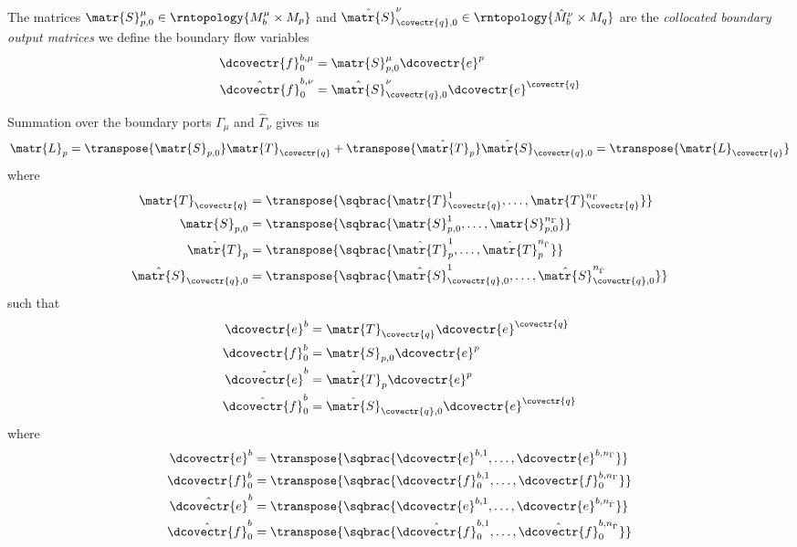 The matrices $\matr{S}^{\mu}_{p,0}\in\rntopology{M^{\mu}_{b}\times M_{p}}$ and
$\hat{\matr{S}}^{\nu}_{\covectr{q},0}\in\rntopology{\hat{M}^{\nu}_{b}\times
  M_{q}}$ are the \emph{collocated boundary output matrices} we define the
boundary flow variables \ie
\begin{align}
  \dcovectr{f}^{b,\mu}_{0}&=\matr{S}^{\mu}_{p,0}\dcovectr{e}^{p}\\
  \hat{\dcovectr{f}}^{b,\nu}_{0}&=\hat{\matr{S}}^{\nu}_{\covectr{q},0}\dcovectr{e}^{\covectr{q}}
\end{align}

Summation over the boundary ports $\Gamma_{\mu}$ and $\hat{\Gamma}_{\nu}$
gives us
\begin{equation}
  \matr{L}_{p}=\transpose{\matr{S}_{p,0}}\matr{T}_{\covectr{q}}+\transpose{\hat{\matr{T}}_{p}}\hat{\matr{S}}_{\covectr{q},0}=\transpose{\matr{L}_{\covectr{q}}}
\end{equation}
where
\begin{align}
  \matr{T}_{\covectr{q}}&=\transpose{\sqbrac{\matr{T}^{1}_{\covectr{q}},\ldots,\matr{T}^{n_{\Gamma}}_{\covectr{q}}}}\\
  \matr{S}_{p,0}&=\transpose{\sqbrac{\matr{S}^{1}_{p,0},\ldots,\matr{S}^{n_{\Gamma}}_{p,0}}}\\
  \hat{\matr{T}}_{p}&=\transpose{\sqbrac{\hat{\matr{T}}^{1}_{p},\ldots,\hat{\matr{T}}^{n_{\hat{\Gamma}}}_{p}}}\\
  \hat{\matr{S}}_{\covectr{q},0}&=\transpose{\sqbrac{\hat{\matr{S}}^{1}_{\covectr{q},0},\ldots,\hat{\matr{S}}^{n_{\hat{\Gamma}}}_{\covectr{q},0}}}
\end{align}
such that
\begin{align}
  \dcovectr{e}^{b}&=\matr{T}_{\covectr{q}}\dcovectr{e}^{\covectr{q}}\\
  \dcovectr{f}^{b}_{0}&=\matr{S}_{p,0}\dcovectr{e}^{p}\\
  \hat{\dcovectr{e}}^{b}&=\hat{\matr{T}}_{p}\dcovectr{e}^{p}\\
  \hat{\dcovectr{f}}^{b}_{0}&=\hat{\matr{S}}_{\covectr{q},0}\dcovectr{e}^{\covectr{q}}  
\end{align}
where
\begin{align}
  \dcovectr{e}^{b}&=\transpose{\sqbrac{\dcovectr{e}^{b,1},\ldots,\dcovectr{e}^{b,n_{\Gamma}}}}\\
  \dcovectr{f}^{b}_{0}&=\transpose{\sqbrac{\dcovectr{f}^{b,1}_{0},\ldots,\dcovectr{f}^{b,n_{\Gamma}}_{0}}}\\
  \hat{\dcovectr{e}}^{b}&=\transpose{\sqbrac{\dcovectr{e}^{b,1},\ldots,\dcovectr{e}^{b,n_{\hat{\Gamma}}}}}\\
  \hat{\dcovectr{f}}^{b}_{0}&=\transpose{\sqbrac{\hat{\dcovectr{f}}^{b,1}_{0},\ldots,\hat{\dcovectr{f}}^{b,n_{\hat{\Gamma}}}_{0}}}
\end{align}

